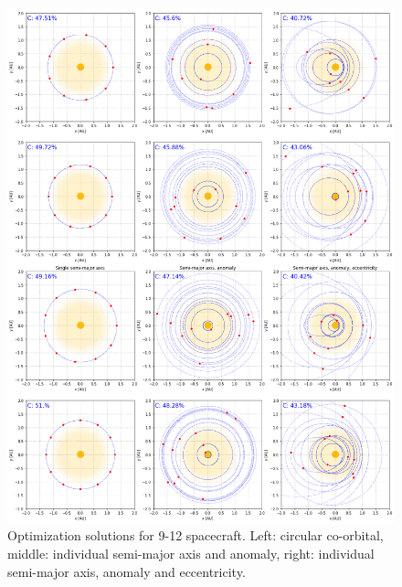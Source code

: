 \begin{figure}[p]
 \centering
 \includegraphics[width=1.0\textwidth]{img/appendix_orbit_3.png}
 \caption{Optimization solutions for 9-12 spacecraft. Left: circular co-orbital, middle: individual semi-major axis and anomaly, right: individual semi-major axis, anomaly and eccentricity.}
\end{figure}

